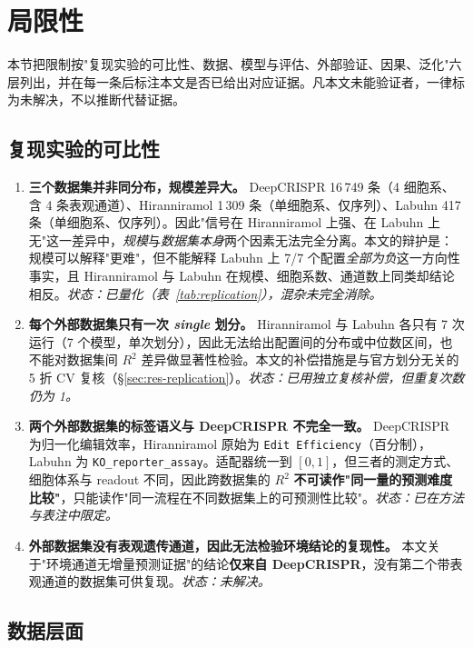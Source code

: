 \section{局限性}
\label{sec:limitations}

本节把限制按"复现实验的可比性、数据、模型与评估、外部验证、因果、泛化"六层列出，并在每一条后标注本文是否已给出对应证据。凡本文未能验证者，一律标为未解决，不以推断代替证据。

\subsection{复现实验的可比性}

\begin{enumerate}
\item \textbf{三个数据集并非同分布，规模差异大。} DeepCRISPR 16\,749 条（4 细胞系、含 4 条表观通道）、Hiranniramol 1\,309 条（单细胞系、仅序列）、Labuhn 417 条（单细胞系、仅序列）。因此"信号在 Hiranniramol 上强、在 Labuhn 上无"这一差异中，\emph{规模}与\emph{数据集本身}两个因素无法完全分离。本文的辩护是：规模可以解释"更难"，但不能解释 Labuhn 上 7/7 个配置\emph{全部为负}这一方向性事实，且 Hiranniramol 与 Labuhn 在规模、细胞系数、通道数上同类却结论相反。\emph{状态：已量化（表~\ref{tab:replication}），混杂未完全消除。}
\item \textbf{每个外部数据集只有一次 \emph{single} 划分。} Hiranniramol 与 Labuhn 各只有 7 次运行（7 个模型，单次划分），因此无法给出配置间的分布或中位数区间，也不能对数据集间 $R^{2}$ 差异做显著性检验。本文的补偿措施是与官方划分无关的 5 折 CV 复核（\S\ref{sec:res-replication}）。\emph{状态：已用独立复核补偿，但重复次数仍为 1。}
\item \textbf{两个外部数据集的标签语义与 DeepCRISPR 不完全一致。} DeepCRISPR 为归一化编辑效率，Hiranniramol 原始为 \texttt{Edit Efficiency}（百分制），Labuhn 为 \texttt{KO\_reporter\_assay}。适配器统一到 $[0,1]$，但三者的测定方式、细胞体系与 readout 不同，因此跨数据集的 $R^{2}$ \textbf{不可读作"同一量的预测难度比较"}，只能读作"同一流程在不同数据集上的可预测性比较"。\emph{状态：已在方法与表注中限定。}
\item \textbf{外部数据集没有表观遗传通道，因此无法检验环境结论的复现性。} 本文关于"环境通道无增量预测证据"的结论\textbf{仅来自 DeepCRISPR}，没有第二个带表观通道的数据集可供复现。\emph{状态：未解决。}
\end{enumerate}

\subsection{数据层面}

